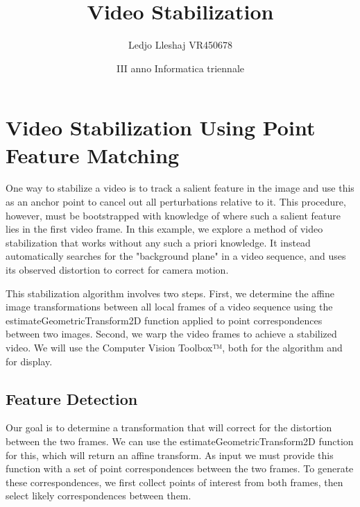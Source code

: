 \documentclass[a4paper]{article}
\title{Video Stabilization}
\author{Ledjo Lleshaj  VR450678}
\date{III anno Informatica triennale}
\begin{document}
 
	\maketitle 
	
	\newpage %
	\tableofcontents %
	
	\newpage 
	\section{Video Stabilization Using Point Feature Matching} 
	
 One way to stabilize a video is to track a salient feature in the image and use this as an anchor point to cancel out all perturbations relative to it. This procedure, however, must be bootstrapped with knowledge of where such a salient feature lies in the first video frame. In this example, we explore a method of video stabilization that works without any such a priori knowledge. It instead automatically searches for the "background plane" in a video sequence, and uses its observed distortion to correct for camera motion.

This stabilization algorithm involves two steps. First, we determine the affine image transformations between all local frames of a video sequence using the estimateGeometricTransform2D function applied to point correspondences between two images. Second, we warp the video frames to achieve a stabilized video. We will use the Computer Vision Toolbox™, both for the algorithm and for display.
	\subsection{Feature Detection}
	Our goal is to determine a transformation that will correct for the distortion between the two frames. We can use the estimateGeometricTransform2D function for this, which will return an affine transform. As input we must provide this function with a set of point correspondences between the two frames. To generate these correspondences, we first collect points of interest from both frames, then select likely correspondences between them.
		
\end{document}
